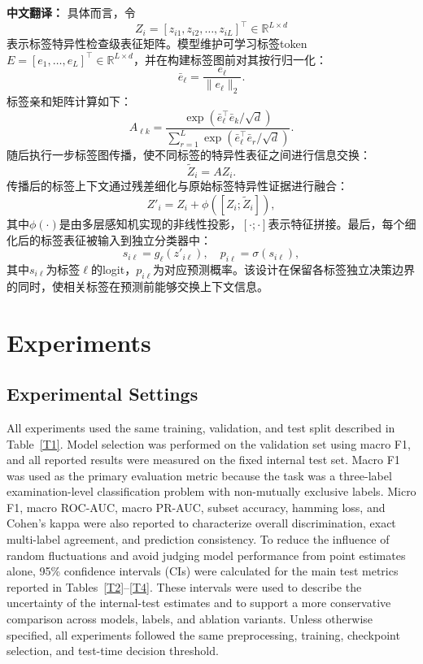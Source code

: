 \documentclass[Afour,sagev,times]{sagej}
\begin{document}
\textbf{中文翻译：} 具体而言，令
\begin{equation}
Z_i=[z_{i1},z_{i2},\ldots,z_{iL}]^{\top}\in\mathbb{R}^{L\times d}
\end{equation}
表示标签特异性检查级表征矩阵。模型维护可学习标签token $E=[e_1,\ldots,e_L]^{\top}\in\mathbb{R}^{L\times d}$，并在构建标签图前对其按行归一化：
\begin{equation}
\bar{e}_{\ell}=\frac{e_{\ell}}{\|e_{\ell}\|_2}.
\end{equation}
标签亲和矩阵计算如下：
\begin{equation}
A_{\ell k}=\frac{\exp(\bar{e}_{\ell}^{\top}\bar{e}_{k}/\sqrt{d})}{\sum_{r=1}^{L}\exp(\bar{e}_{\ell}^{\top}\bar{e}_{r}/\sqrt{d})}.
\end{equation}
随后执行一步标签图传播，使不同标签的特异性表征之间进行信息交换：
\begin{equation}
\tilde{Z}_{i}=AZ_i.
\end{equation}
传播后的标签上下文通过残差细化与原始标签特异性证据进行融合：
\begin{equation}
Z'_{i}=Z_i+\phi([Z_i;\tilde{Z}_{i}]),
\end{equation}
其中$\phi(\cdot)$是由多层感知机实现的非线性投影，$[\cdot;\cdot]$表示特征拼接。最后，每个细化后的标签表征被输入到独立分类器中：
\begin{equation}
s_{i\ell}=g_{\ell}(z'_{i\ell}), \quad p_{i\ell}=\sigma(s_{i\ell}),
\end{equation}
其中$s_{i\ell}$为标签$\ell$的logit，$p_{i\ell}$为对应预测概率。该设计在保留各标签独立决策边界的同时，使相关标签在预测前能够交换上下文信息。

\section{Experiments}

\subsection{Experimental Settings}
All experiments used the same training, validation, and test split described in Table~\ref{T1}. Model selection was performed on the validation set using macro F1, and all reported results were measured on the fixed internal test set. Macro F1 was used as the primary evaluation metric because the task was a three-label examination-level classification problem with non-mutually exclusive labels. Micro F1, macro ROC-AUC, macro PR-AUC, subset accuracy, hamming loss, and Cohen's kappa were also reported to characterize overall discrimination, exact multi-label agreement, and prediction consistency.\cite{R18} To reduce the influence of random fluctuations and avoid judging model performance from point estimates alone, 95\% confidence intervals (CIs) were calculated for the main test metrics reported in Tables~\ref{T2}--\ref{T4}. These intervals were used to describe the uncertainty of the internal-test estimates and to support a more conservative comparison across models, labels, and ablation variants. Unless otherwise specified, all experiments followed the same preprocessing, training, checkpoint selection, and test-time decision threshold.
\end{document}
